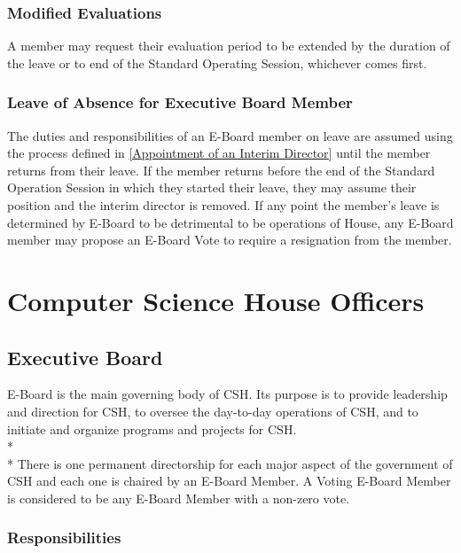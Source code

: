 \documentclass{article}
\newcommand{\article}[1]{\section{#1} \label{#1}}
\newcommand{\asection}[1]{\subsection{#1} \label{#1}}
\newcommand{\asubsection}[1]{\subsubsection{#1} \label{#1}}
\begin{document}
\asubsection{Modified Evaluations}
A member may request their evaluation period to be extended by the duration of the leave or to end of the Standard Operating Session, whichever comes first.

\asubsection{Leave of Absence for Executive Board Member}
The duties and responsibilities of an E-Board member on leave are assumed using the process defined in \ref{Appointment of an Interim Director} until the member returns from their leave.
If the member returns before the end of the Standard Operation Session in which they started their leave, they may assume their position and the interim director is removed. %
If any point the member's leave is determined by E-Board to be detrimental to be operations of House, any E-Board member may propose an E-Board Vote to require a resignation from the member.

\article{Computer Science House Officers}

\asection{Executive Board}
E-Board is the main governing body of CSH.
Its purpose is to provide leadership and direction for CSH, to oversee the day-to-day operations of CSH, and to initiate and organize programs and projects for CSH.
\\*\\*
There is one permanent directorship for each major aspect of the government of CSH and each one is chaired by an E-Board Member.
A Voting E-Board Member is considered to be any E-Board Member with a non-zero vote. %

\asubsection{Responsibilities}
\renewcommand{\theenumi}{\alph{enumi}} %
\end{document}
